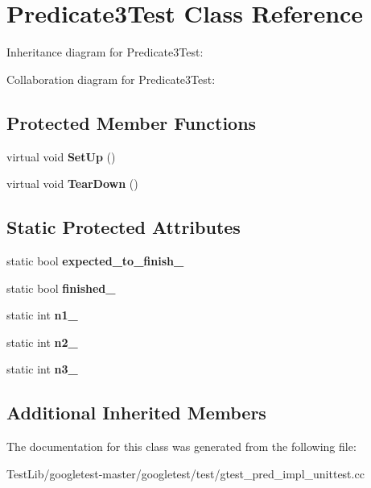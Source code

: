 \hypertarget{classPredicate3Test}{}\section{Predicate3\+Test Class Reference}
\label{classPredicate3Test}


Inheritance diagram for Predicate3\+Test\+:


Collaboration diagram for Predicate3\+Test\+:
\subsection*{Protected Member Functions}
\begin{DoxyCompactItemize}
\item 
\mbox{\label{classPredicate3Test_a92aad9566e0737b6739d1db14e7912be}} 
virtual void {\bfseries Set\+Up} ()
\item 
\mbox{\label{classPredicate3Test_aa4dc395bded849b6e5175566d791aba7}} 
virtual void {\bfseries Tear\+Down} ()
\end{DoxyCompactItemize}
\subsection*{Static Protected Attributes}
\begin{DoxyCompactItemize}
\item 
\mbox{\label{classPredicate3Test_a42c11555410ee89bf6e59d39336a212c}} 
static bool {\bfseries expected\+\_\+to\+\_\+finish\+\_\+}
\item 
\mbox{\label{classPredicate3Test_aa2ef0fa6aed09d872fb9ae36961b49eb}} 
static bool {\bfseries finished\+\_\+}
\item 
\mbox{\label{classPredicate3Test_ac232320a93f0c1e09886148a3e1929a5}} 
static int {\bfseries n1\+\_\+}
\item 
\mbox{\label{classPredicate3Test_a11049ef16bcaadc8262faf7349c7676e}} 
static int {\bfseries n2\+\_\+}
\item 
\mbox{\label{classPredicate3Test_afc1df6b079ffe22b87479b161d2ad2f7}} 
static int {\bfseries n3\+\_\+}
\end{DoxyCompactItemize}
\subsection*{Additional Inherited Members}


The documentation for this class was generated from the following file\+:\begin{DoxyCompactItemize}
\item 
Test\+Lib/googletest-\/master/googletest/test/gtest\+\_\+pred\+\_\+impl\+\_\+unittest.\+cc\end{DoxyCompactItemize}
